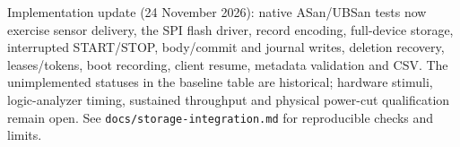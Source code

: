 Implementation update (24 November 2026): native ASan/UBSan tests now exercise sensor delivery, the SPI flash driver, record encoding, full-device storage, interrupted START/STOP, body/commit and journal writes, deletion recovery, leases/tokens, boot recording, client resume, metadata validation and CSV. The unimplemented statuses in the baseline table are historical; hardware stimuli, logic-analyzer timing, sustained throughput and physical power-cut qualification remain open. See \texttt{docs/storage-integration.md} for reproducible checks and limits.
